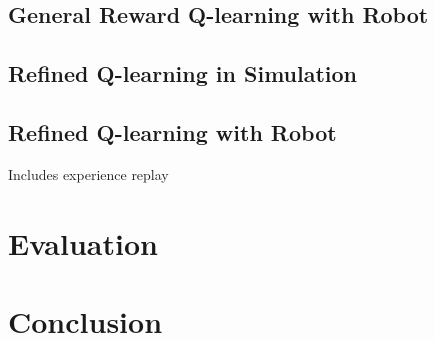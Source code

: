 \documentclass[12pt,a4paper]{article}
\begin{document}
\subsection{General Reward Q-learning with Robot}
\subsection{Refined Q-learning in Simulation}
\subsection{Refined Q-learning with Robot}
Includes experience replay
\section{Evaluation}
\section{Conclusion}



\end{document}
